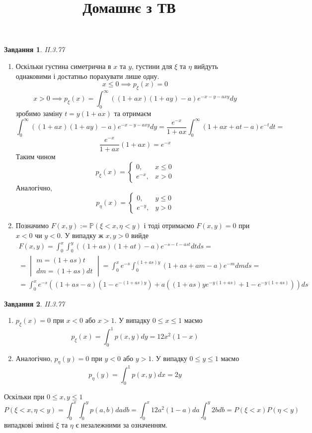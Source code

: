 \documentclass[8pt]{article} %
\title{Домашнє з ТВ
}
\newtheorem*{prob}{Завдання}
\begin{document}
\maketitle
\begin{prob}II.3.77\end{prob}
	\begin{enumerate}[label=(\alph*)]
		\item{Оскільки густина симетрична в $x$ та $y$, густини для $\xi$ та $\eta$ вийдуть однаковими і достатньо порахувати лише одну.
			\[x\leq0\implies p_{\xi}(x)=0\]
			\[x>0\implies p_{\xi}(x)=\int_0^{\infty}((1+ax)(1+ay)-a)e^{-x-y-axy}dy\]
			зробимо заміну $t=y(1+ax)$ та отримаєм
			\[\int_0^{\infty}((1+ax)(1+ay)-a)e^{-x-y-axy}dy=\frac{e^{-x}}{1+ax}\int_0^{\infty}(1+ax+at-a)e^{-t}dt=\]
			\[\frac{e^{-x}}{1+ax}(1+ax)=e^{-x}\]
			Таким чином
			\[p_{\xi}(x)=\begin{cases}
				0, &x\leq 0\\
				e^{-x}, &x>0
			\end{cases}
			\]
			Аналогічно,
			\[p_{\eta}(x)=\begin{cases}
				0, &y\leq 0\\
				e^{-y}, &y>0
			\end{cases}
			\]
			}
		\item{Позначимо $F(x,y):=\mathbb{P}(\xi<x,\eta<y)$ і тоді отримаємо $F(x,y)=0$ при $x<0$ чи $y<0$. У випадку ж
			$x,y>0$ вийде
			\begin{gather*}
				F(x,y)=\int_0^x\int_0^y((1+as)(1+at)-a)e^{-s-t-ast}dtds=\\
				=\begin{vmatrix}m=(1+as)t\\dm=(1+as)dt\end{vmatrix}=\int_0^xe^{-s}\int_0^{(1+as)y}(1+as+am-a)e^{-m}dmds=\\
					=\int_0^x
					e^{-s}
					((1+as-a)(1-e^{-(1+as)y})+
					a((1+as)ye^{-y(1+as)}+1-e^{-y(1+as)}))
					ds
			\end{gather*}
			}
	\end{enumerate}
\begin{prob}II.3.77\end{prob}
	\begin{enumerate}[label=(\alph*)]
		\item{$p_{\xi}(x)=0$ при $x<0$ або $x>1$. У випадку $0\leq x \leq 1$ маємо
			\[p_{\xi}(x)=\int_0^1p(x,y)dy=12x^2(1-x)\]
			}
		\item{
			Аналогічно, $p_{\eta}(y)=0$ при $y<0$ або $y>1$. У випадку $0\leq y \leq 1$ маємо
			\[p_{\eta}(y)=\int_0^1p(x,y)dx=2y\]
			}
	\end{enumerate}
	Оскільки при $0\leq x,y\leq 1$
	\[P(\xi<x,\eta<y)=\int_0^x\int_0^y p(a,b)dadb=\int_0^x12a^2(1-a)da\int_0^y2bdb=P(\xi<x)P(\eta<y)\]
	випадкові змінні $\xi$ та $\eta$ є незалежними за означенням.
\end{document}
